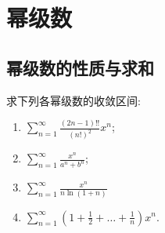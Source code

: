 \chapter{幂级数}

\section{幂级数的性质与求和}

\begin{problem}
    求下列各幂级数的收敛区间:
    \begin{enumerate}
        \item \(\sum_{n=1}^{\infty} \frac{(2n-1)!!}{(n!)^2} x^n\);
        \item \(\sum_{n=1}^{\infty} \frac{x^{n}}{a^{n} + b^{n}}\);
        \item \(\sum_{n=1}^{\infty} \frac{x^n}{n \ln(1+n)}\)
        \item \(\sum_{n=1}^{\infty} \left(1 + \frac{1}{2} + \dots +
            \frac{1}{n}\right) x^n\).
    \end{enumerate}
\end{problem}

